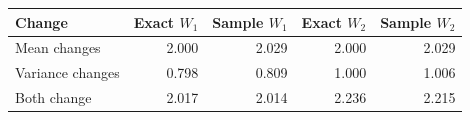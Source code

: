 \begin{tabular}{lrrrr}
\toprule
Change & Exact $W_1$ & Sample $W_1$ & Exact $W_2$ & Sample $W_2$\\
\midrule
Mean changes & 2.000 & 2.029 & 2.000 & 2.029\\
Variance changes & 0.798 & 0.809 & 1.000 & 1.006\\
Both change & 2.017 & 2.014 & 2.236 & 2.215\\
\bottomrule
\end{tabular}
